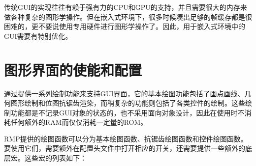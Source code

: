 传统GUI的实现往往有赖于强有力的CPU和GPU的支持，并且需要很大的内存来做各种复杂的图形学操作。但在嵌入式环境下，很多时候凑出足够的帧缓存都是很困难的，更不要说使用专用硬件进行图形学操作了。因此，用于嵌入式环境中的GUI需要有特别优化。

\section{图形界面的使能和配置}\label{sec:enabling-and-configuring-the-graphics-interface}

通过提供一系列绘制功能来支持GUI界面，它的基本绘图功能包括了画点画线、几何图形绘制和位图抗锯齿渲染，而稍复杂的功能则包括了各类控件的绘制。这些绘制功能都是不记录GUI对象的状态的，也不采用面向对象设计，因此在使用时不消耗任何额外的RAM而仅仅消耗一定量的ROM。

RMP提供的绘图函数可以分为基本绘图函数、抗锯齿绘图函数和控件绘图函数。要使用它们，需要额外在配置头文件中打开相应的开关，还需要提供一些额外的底层宏。这些宏的列表如下：

\label{tab:macros-required-to-use-the-built-in-embedded-gui}

